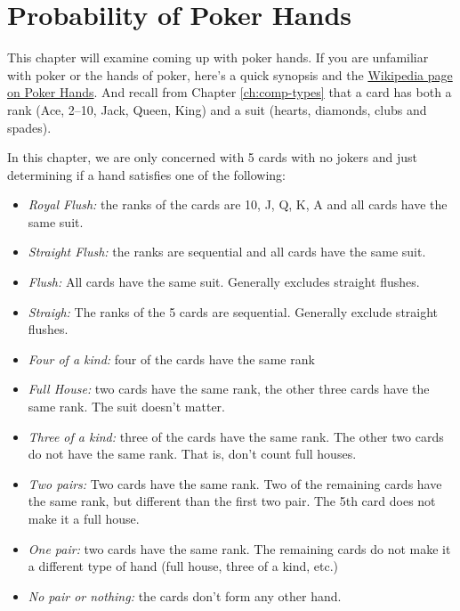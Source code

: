
\chapter{Probability of Poker Hands} \label{ch:poker}

This chapter will examine coming up with poker hands. If you are unfamiliar with poker or the hands of poker, here's a quick synopsis and the \href{https://en.wikipedia.org/wiki/List_of_poker_hands}{Wikipedia page on Poker Hands}.  And recall from Chapter \ref{ch:comp-types} that a card has both a rank (Ace, 2--10, Jack, Queen, King) and a suit (hearts, diamonds, clubs and spades). 

In this chapter, we are only concerned with 5 cards with no jokers and just determining if a hand satisfies one of the following:

\begin{itemize}
\item \emph{Royal Flush:} the ranks of the cards are 10, J, Q, K, A and all cards have the same suit. 
\item \emph{Straight Flush:} the ranks are sequential and all cards have the same suit. 
\item \emph{Flush:} All cards have the same suit.  Generally excludes straight flushes. 
\item \emph{Straigh:} The ranks of the 5 cards are sequential.  Generally exclude straight flushes. 
\item \emph{Four of a kind:} four of the cards have the same rank
\item \emph{Full House:} two cards have the same rank, the other three cards have the same rank.  The suit doesn't matter. 
\item \emph{Three of a kind:} three of the cards have the same rank.  The other two cards do not have the same rank.  That is, don't count full houses. 
\item \emph{Two pairs:} Two cards have the same rank.  Two of the remaining cards have the same rank, but different than the first two pair.  The 5th card does not make it a full house. 
\item \emph{One pair:} two cards have the same rank.  The remaining cards do not make it a different type of hand (full house, three of a kind, etc.) 
\item \emph{No pair or nothing:} the cards don't form any other hand. 
\end{itemize}

